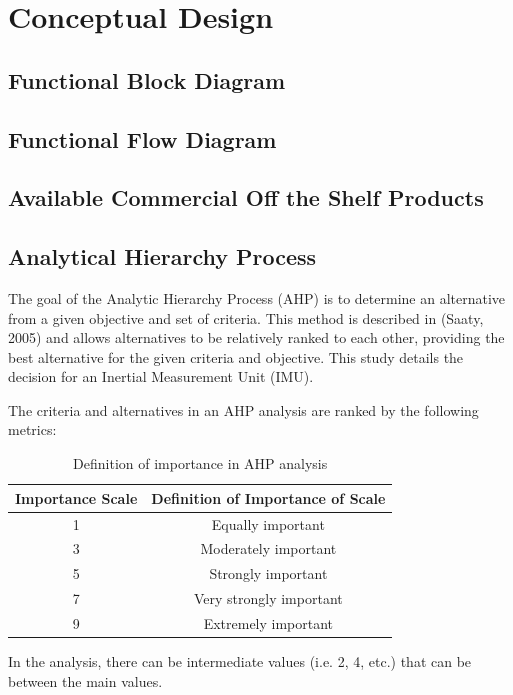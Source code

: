 \section{Conceptual Design} \label{sec:conceptual_design}

\subsection{Functional Block Diagram} \label{ssec:block_diagram}

\subsection{Functional Flow Diagram} \label{ssec:flow_diagram}

\subsection{Available Commercial Off the Shelf Products} \label{ssec:cots_products}

\subsection{Analytical Hierarchy Process} \label{ssec:ahp}
The goal of the Analytic Hierarchy Process (AHP) is to determine an alternative from a given objective and set of criteria. This method is described in (Saaty, 2005) and allows alternatives to be relatively ranked to each other, providing the best alternative for the given criteria and objective. This study details the decision for an Inertial Measurement Unit (IMU).

The criteria and alternatives in an AHP analysis are ranked by the following metrics: \\
\begin{table}
\centering
\begin{tabular}{|c|c|}
\hline
    \textbf{Importance Scale} & \textbf{Definition of Importance of Scale} \\
    \hline
    1 & Equally important \\ \hline
    3 & Moderately important \\ \hline
    5 & Strongly important \\ \hline
    7 & Very strongly important \\ \hline
    9 & Extremely important \\
    \hline
\end{tabular}
\caption{Definition of importance in AHP analysis}
\label{tab:ahp_importance_scale}
\end{table}
In the analysis, there can be intermediate values (i.e. 2, 4, etc.) that can be between the main values.

